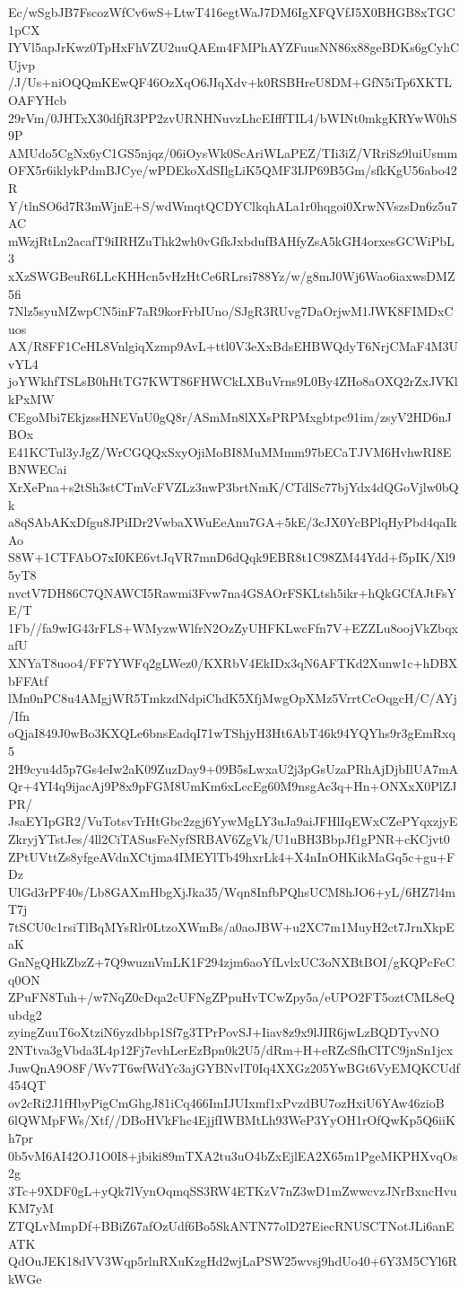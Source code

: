 Ec/wSgbJB7FscozWfCv6wS+LtwT416egtWaJ7DM6IgXFQVfJ5X0BHGB8xTGC1pCX
IYVl5apJrKwz0TpHxFhVZU2uuQAEm4FMPhAYZFuusNN86x88geBDKs6gCyhCUjvp
/J/Us+niOQQmKEwQF46OzXqO6JIqXdv+k0RSBHreU8DM+GfN5iTp6XKTLOAFYHcb
29rVm/0JHTxX30dfjR3PP2zvURNHNuvzLhcEIfffTIL4/bWINt0mkgKRYwW0hS9P
AMUdo5CgNx6yC1GS5njqz/06iOysWk0ScAriWLaPEZ/TIi3iZ/VRriSz9luiUsmm
OFX5r6iklykPdmBJCye/wPDEkoXdSIlgLiK5QMF3IJP69B5Gm/sfkKgU56abo42R
Y/tlnSO6d7R3mWjnE+S/wdWmqtQCDYClkqhALa1r0hqgoi0XrwNVszsDn6z5u7AC
mWzjRtLn2acafT9iIRHZuThk2wh0vGfkJxbdufBAHfyZsA5kGH4orxesGCWiPbL3
xXzSWGBeuR6LLcKHHcn5vHzHtCe6RLrsi788Yz/w/g8mJ0Wj6Wao6iaxwsDMZ5fi
7Nlz5syuMZwpCN5inF7aR9korFrbIUno/SJgR3RUvg7DaOrjwM1JWK8FIMDxCuos
AX/R8FF1CeHL8VnlgiqXzmp9AvL+ttl0V3eXxBdsEHBWQdyT6NrjCMaF4M3UvYL4
joYWkhfTSLsB0hHtTG7KWT86FHWCkLXBuVrns9L0By4ZHo8aOXQ2rZxJVKlkPxMW
CEgoMbi7EkjzssHNEVnU0gQ8r/ASmMn8lXXsPRPMxgbtpc91im/zsyV2HD6nJBOx
E41KCTul3yJgZ/WrCGQQxSxyOjiMoBI8MuMMmm97bECaTJVM6HvhwRI8EBNWECai
XrXePna+s2tSh3stCTmVcFVZLz3nwP3brtNmK/CTdlSc77bjYdx4dQGoVjlw0bQk
a8qSAbAKxDfgu8JPiIDr2VwbaXWuEeAnu7GA+5kE/3cJX0YcBPlqHyPbd4qaIkAo
S8W+1CTFAbO7xI0KE6vtJqVR7mnD6dQqk9EBR8t1C98ZM44Ydd+f5pIK/Xl95yT8
nvctV7DH86C7QNAWCI5Rawmi3Fvw7na4GSAOrFSKLtsh5ikr+hQkGCfAJtFsYE/T
1Fb//fa9wIG43rFLS+WMyzwWlfrN2OzZyUHFKLwcFfn7V+EZZLu8oojVkZbqxafU
XNYaT8uoo4/FF7YWFq2gLWez0/KXRbV4EkIDx3qN6AFTKd2Xunw1c+hDBXbFFAtf
lMn0nPC8u4AMgjWR5TmkzdNdpiChdK5XfjMwgOpXMz5VrrtCcOqgcH/C/AYj/Ifn
oQjaI849J0wBo3KXQLe6bnsEadqI71wTShjyH3Ht6AbT46k94YQYhs9r3gEmRxq5
2H9cyu4d5p7Gs4eIw2aK09ZuzDay9+09B5sLwxaU2j3pGsUzaPRhAjDjbIlUA7mA
Qr+4YI4q9ijacAj9P8x9pFGM8UmKm6xLccEg60M9nsgAc3q+Hn+ONXxX0PlZJPR/
JsaEYIpGR2/VuTotsvTrHtGbc2zgj6YywMgLY3uJa9aiJFHlIqEWxCZePYqxzjyE
ZkryjYTstJes/4ll2CiTASusFeNyfSRBAV6ZgVk/U1uBH3BbpJf1gPNR+cKCjvt0
ZPtUVttZs8yfgeAVdnXCtjma4IMEYlTb49hxrLk4+X4nInOHKikMaGq5c+gu+FDz
UlGd3rPF40s/Lb8GAXmHbgXjJka35/Wqn8InfbPQhsUCM8hJO6+yL/6HZ7l4mT7j
7tSCU0c1rsiTlBqMYsRlr0LtzoXWmBs/a0aoJBW+u2XC7m1MuyH2ct7JrnXkpEaK
GnNgQHkZbzZ+7Q9wuznVmLK1F294zjm6aoYfLvlxUC3oNXBtBOI/gKQPcFeCq0ON
ZPuFN8Tuh+/w7NqZ0cDqa2cUFNgZPpuHvTCwZpy5a/eUPO2FT5oztCML8eQubdg2
zyingZuuT6oXtziN6yzdbbp1Sf7g3TPrPovSJ+Iiav8z9x9lJIR6jwLzBQDTyvNO
2NTtva3gVbda3L4p12Fj7evhLerEzBpn0k2U5/dRm+H+eRZcSfhCITC9jnSn1jcx
JuwQnA9O8F/Wv7T6wfWdYc3ajGYBNvlT0Iq4XXGz205YwBGt6VyEMQKCUdf454QT
ov2cRi2J1fHbyPigCmGhgJ81iCq466ImIJUIxmf1xPvzdBU7ozHxiU6YAw46zioB
6lQWMpFWs/Xtf//DBoHVkFhc4EjjfIWBMtLh93WeP3YyOH1rOfQwKp5Q6iiKh7pr
0b5vM6AI42OJ1O0I8+jbiki89mTXA2tu3uO4bZxEjlEA2X65m1PgeMKPHXvqOs2g
3Tc+9XDF0gL+yQk7lVynOqmqSS3RW4ETKzV7nZ3wD1mZwwcvzJNrBxncHvuKM7yM
ZTQLvMmpDf+BBiZ67afOzUdf6Bo5SkANTN77olD27EiecRNUSCTNotJLi6anEATK
QdOuJEK18dVV3Wqp5rlnRXuKzgHd2wjLaPSW25wvsj9hdUo40+6Y3M5CYl6RkWGe
